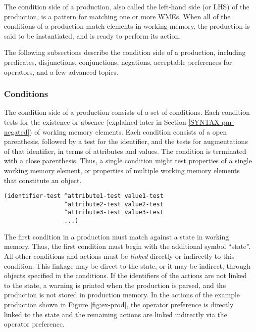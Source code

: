 The condition side of a production, also called the left-hand side (or
LHS) of the production, is a pattern for matching one or more WMEs. When
all of the conditions of a production match elements in working memory,
the production is said to be instantiated, and is ready to perform its
action.

The following subsections describe the condition side of a production,
including predicates, disjunctions, conjunctions, negations, acceptable
preferences for operators, and a few advanced topics. 

\subsubsection{Conditions}
\label{Conditions}

The condition side of a production consists of a set of conditions.
Each condition tests for the existence or absence (explained later in
Section \ref{SYNTAX-pm-negated}) of working memory elements. Each
condition consists of a open parenthesis, followed by a test for the
identifier, and the tests for augmentations of that identifier, in terms
of attributes and values.  The condition is terminated with a close
parenthesis.  Thus, a single condition might test properties of a single
working memory element, or properties of multiple working memory
elements that constitute an object.  
\begin{verbatim}
(identifier-test ^attribute1-test value1-test 
                 ^attribute2-test value2-test
                 ^attribute3-test value3-test
                 ...)
\end{verbatim}
The first condition in a production must match against a state in
working memory.  Thus, the first condition must begin with the
additional symbol ``state''.  All other conditions and actions must be
\textit{linked} directly or indirectly to this condition. This linkage
may be direct to the state, or it may be indirect, through objects
specified in the conditions.  If the identifiers of the actions are not
linked to the state, a warning is printed when the production is parsed,
and the production is not stored in production memory.  In the actions
of the example production shown in Figure \ref{fig:ex-prod}, the
operator preference is directly linked to the state and the remaining
actions are linked indirectly via the operator preference.

